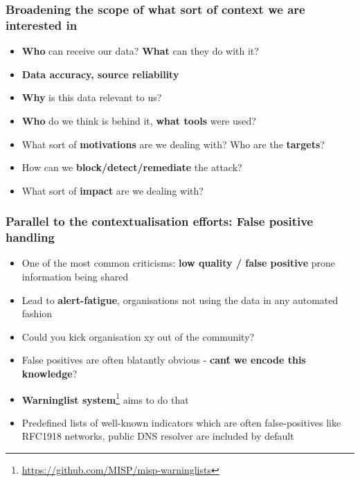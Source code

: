 \begin{frame}
\frametitle{Broadening the scope of what sort of context we are interested in}
\begin{itemize}
       \item {\bf Who} can receive our data? {\bf What} can they do with it?
       \item {\bf Data accuracy, source reliability}
       \item {\bf Why} is this data relevant to us?
       \item {\bf Who} do we think is behind it, {\bf what tools} were used?
       \item What sort of {\bf motivations} are we dealing with? Who are the {\bf targets}?
       \item How can we {\bf block/detect/remediate} the attack?
       \item What sort of {\bf impact} are we dealing with?
\end{itemize}
\end{frame}

\begin{frame}
\frametitle{Parallel to the contextualisation efforts: False positive handling}
\begin{itemize}
        \item One of the most common criticisms: {\bf low quality / false positive} prone information being shared
        \item Lead to {\bf alert-fatigue}, organisations not using the data in any automated fashion
        \item Could you kick organisation xy out of the community?
        \item False positives are often blatantly obvious - {\bf can\'t we encode this knowledge}?
        \item {\bf Warninglist system}\footnote{\url{https://github.com/MISP/misp-warninglists}} aims to do that
        \item Predefined lists of well-known indicators which are often false-positives like RFC1918 networks, public DNS resolver are included by default
\end{itemize}
\end{frame}

